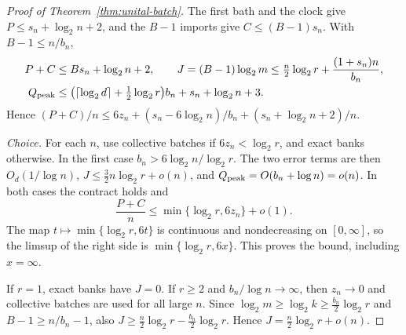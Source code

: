 \begin{proof}[Proof of Theorem~\ref{thm:unital-batch}]
The first bath and the clock give $P\leq s_n+\log_2n+2$, and the $B-1$
imports give $C\leq(B-1)s_n$. With $B-1\leq n/b_n$,
\begin{align*}
 P+C&\leq Bs_n+\log_2n+2,\qquad
 J=(B-1)\log_2m\leq\tfrac n2\log_2r+\frac{(1+s_n)n}{b_n},\\
 Q_{\rm peak}&\leq\bigl(\lceil\log_2d\rceil+\tfrac12\log_2r\bigr)b_n
 +s_n+\log_2n+3.
\end{align*}
Hence $(P+C)/n\leq6z_n+(s_n-6\log_2n)/b_n+(s_n+\log_2n+2)/n$.

\emph{Choice.} For each $n$, use collective batches if $6z_n<\log_2r$,
and exact banks otherwise. In the first case $b_n>6\log_2n/\log_2r$.
The two error terms are then $O_d(1/\log n)$,
$J\leq\frac32n\log_2r+o(n)$, and $Q_{\rm peak}=O(b_n+\log n)=o(n)$. In
both cases the contract holds and
\[
 \frac{P+C}n\leq\min\{\log_2r,6z_n\}+o(1).
\]
The map $t\mapsto\min\{\log_2r,6t\}$ is continuous and nondecreasing on
$[0,\infty]$, so the limsup of the right side is $\min\{\log_2r,6x\}$.
This proves the bound, including $x=\infty$.

If $r=1$, exact banks have $J=0$. If $r\geq2$ and $b_n/\log n\to\infty$,
then $z_n\to0$ and collective batches are used for all large $n$. Since $\log_2m\geq\log_2k\geq\frac{b_n}2\log_2r$ and
$B-1\geq n/b_n-1$, also $J\geq\frac n2\log_2r-\frac{b_n}2\log_2r$.
Hence $J=\frac n2\log_2r+o(n)$.
\end{proof}
